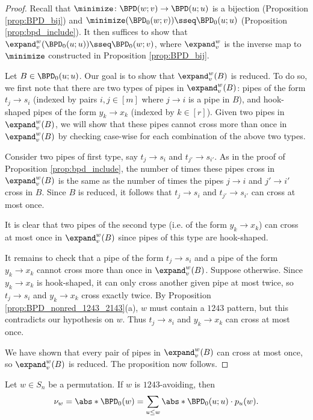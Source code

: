 \begin{proof}
    Recall that $\minimize\colon \BPD(w;v)\to \BPD(u;u)$ is a bijection (Proposition \ref{prop:BPD_bij}) and $\minimize(\BPD_0(w;v)) \sseq \BPD_0(u;u)$ (Proposition \ref{prop:bpd_include}).
    It then suffices to show that $\expand_v^w(\BPD_0(u;u)) \sseq \BPD_0(w;v)$, where $\expand_v^w$ is the inverse map to $\minimize$ constructed in Proposition \ref{prop:BPD_bij}.
    
    Let $B\in \BPD_0(u;u)$.
    Our goal is to show that $\expand_v^w(B)$ is reduced.
    To do so, we first note that there are two types of pipes in $\expand_v^w(B)$:
    pipes of the form $t_j\to s_i$ (indexed by pairs $i,j\in [m]$ where $j\to i$ is a pipe in $B$),
    and hook-shaped pipes of the form $y_k\to x_k$ (indexed by $k\in [r]$).
    Given two pipes in $\expand_v^w(B)$, we will show that these pipes cannot cross more than once in $\expand_v^w(B)$ by checking case-wise for each combination of the above two types.
    
    Consider two pipes of first type, say $t_j\to s_i$ and $t_{j'}\to s_{i'}$.
    As in the proof of Proposition \ref{prop:bpd_include},
    the number of times these pipes cross in $\expand_v^w(B)$ is the same as the number of times the pipes $j\to i$ and $j'\to i'$ cross in $B$.
    Since $B$ is reduced, it follows that $t_j\to s_i$ and $t_{j'}\to s_{i'}$ can cross at most once.
    
    It is clear that two pipes of the second type (i.e. of the form $y_k\to x_k$) can cross at most once in $\expand_v^w(B)$ since pipes of this type are hook-shaped.
    
    It remains to check that a pipe of the form $t_j\to s_i$ and a pipe of the form $y_k\to x_k$ cannot cross more than once in $\expand_v^w(B)$.
    Suppose otherwise.
    Since $y_k\to x_k$ is hook-shaped, it can only cross another given pipe at most twice, so $t_j\to s_i$ and $y_k\to x_k$ cross exactly twice.
    By Proposition \ref{prop:BPD_nonred_1243_2143}(a), $w$ must contain a $1243$ pattern, but this contradicts our hypothesis on $w$.
    Thus $t_j\to s_i$ and $y_k\to x_k$ can cross at most once.
    
    We have shown that every pair of pipes in $\expand_v^w(B)$ can cross at most once, so $\expand_v^w(B)$ is reduced.
    The proposition now follows.
\end{proof}

\begin{proposition}
\label{prop:schub_1243}
    Let $w\in S_n$ be a permutation.
    If $w$ is $1243$-avoiding,
    then \[
        \nu_w = \abs*{\BPD_0(w)}
        = \sum_{u\leq w} \abs*{\BPD_0(u;u)}\cdot p_u(w).
    \]
\end{proposition}

